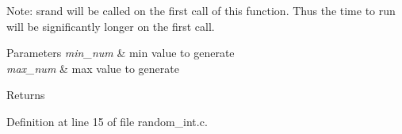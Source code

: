 Note\+: srand will be called on the first call of this function. Thus the time to run will be significantly longer on the first call.


\begin{DoxyParams}{Parameters}
{\em min\+\_\+num} & min value to generate \\
\hline
{\em max\+\_\+num} & max value to generate \\
\hline
\end{DoxyParams}
\begin{DoxyReturn}{Returns}

\end{DoxyReturn}


Definition at line 15 of file random\+\_\+int.\+c.

